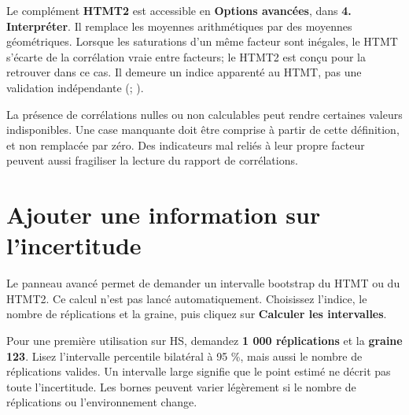 \documentclass[
  french,
  11pt,
  a4paper,
  DIV=11,
  numbers=noendperiod]{scrreprt}
\begin{document}
Le complément \textbf{HTMT2} est accessible en \textbf{Options
avancées}, dans \textbf{4. Interpréter}. Il remplace les moyennes
arithmétiques par des moyennes géométriques. Lorsque les saturations
d'un même facteur sont inégales, le HTMT s'écarte de la corrélation
vraie entre facteurs; le HTMT2 est conçu pour la retrouver dans ce cas.
Il demeure un indice apparenté au HTMT, pas une validation indépendante
(;
).

La présence de corrélations nulles ou non calculables peut rendre
certaines valeurs indisponibles. Une case manquante doit être comprise à
partir de cette définition, et non remplacée par zéro. Des indicateurs
mal reliés à leur propre facteur peuvent aussi fragiliser la lecture du
rapport de corrélations.

\section{Ajouter une information sur
l'incertitude}\label{ajouter-une-information-sur-lincertitude}

Le panneau avancé permet de demander un intervalle bootstrap du HTMT ou
du HTMT2. Ce calcul n'est pas lancé automatiquement. Choisissez
l'indice, le nombre de réplications et la graine, puis cliquez sur
\textbf{Calculer les intervalles}.

Pour une première utilisation sur HS, demandez \textbf{1 000
réplications} et la \textbf{graine 123}. Lisez l'intervalle percentile
bilatéral à 95 \%, mais aussi le nombre de réplications valides. Un
intervalle large signifie que le point estimé ne décrit pas toute
l'incertitude. Les bornes peuvent varier légèrement si le nombre de
réplications ou l'environnement change.

\end{document}
